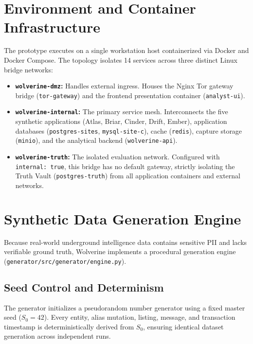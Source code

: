 \section{Environment and Container Infrastructure}
\label{sec:exp-environment}
The prototype executes on a single workstation host containerized via Docker and Docker Compose. The topology isolates 14 services across three distinct Linux bridge networks:

\begin{itemize}
    \item \textbf{\texttt{wolverine-dmz}:} Handles external ingress. Houses the Nginx Tor gateway bridge (\texttt{tor-gateway}) and the frontend presentation container (\texttt{analyst-ui}).
    \item \textbf{\texttt{wolverine-internal}:} The primary service mesh. Interconnects the five synthetic applications (Atlas, Briar, Cinder, Drift, Ember), application databases (\texttt{postgres-sites}, \texttt{mysql-site-c}), cache (\texttt{redis}), capture storage (\texttt{minio}), and the analytical backend (\texttt{wolverine-api}).
    \item \textbf{\texttt{wolverine-truth}:} The isolated evaluation network. Configured with \texttt{internal: true}, this bridge has no default gateway, strictly isolating the Truth Vault (\texttt{postgres-truth}) from all application containers and external networks.
\end{itemize}

\section{Synthetic Data Generation Engine}
\label{sec:exp-synthetic-generation}
Because real-world underground intelligence data contains sensitive PII and lacks verifiable ground truth, Wolverine implements a procedural generation engine (\texttt{generator/src/generator/engine.py}).

\subsection{Seed Control and Determinism}
The generator initializes a pseudorandom number generator using a fixed master seed ($S_0 = 42$). Every entity, alias mutation, listing, message, and transaction timestamp is deterministically derived from $S_0$, ensuring identical dataset generation across independent runs.

